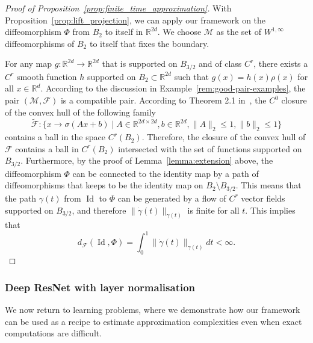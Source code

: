 \documentclass[12pt]{amsart}
\numberwithin{equation}{section}
\theoremstyle{remark}
\begin{document}
\begin{proof}[Proof of Proposition~\ref{prop:finite_time_approximation}]

With Proposition~\ref{prop:lift_projection}, we can apply our framework on the diffeomorphism $\Phi$ from $B_2$ to itself in $\mathbb R^{2d}$. We choose $\mathcal M$ as the set of $W^{1,\infty}$ diffeomorphisms of $B_2$ to itself that fixes the boundary.

For any map $g:\mathbb R^{2d} \to \mathbb R^{2d}$ that is supported on $B_{3/2}$ and of class $C^r$, there exists a $C^r$ smooth function $h$ supported on $B_2\subset \mathbb R^{2d}$ such that $g(x) = h(x)\rho(x)$ for all $x\in \mathbb{R}^d$. 
According to the discussion in Example~\ref{rem:good-pair-examples}, the pair $(\mathcal M, \mathcal F)$ is a compatible pair. According to Theorem 2.1 in~\cite{yang2025optimal}, the $C^0$ closure of the convex hull of the following family
\begin{equation}
\tilde{\mathcal F}:  \{x\to \sigma(A x+b) \mid A\in \mathbb R^{2d\times 2d}, b\in \mathbb R^{2d}, \|A\|_2 \le 1, \|b\|_2 \le 1 \}
\end{equation}
contains a ball in the space $C^r(B_2)$. Therefore, the closure of the convex hull of $\mathcal F$ contains a ball in $C^r(B_2)$ intersected with the set of functions supported on $B_{3/2}$. 
Furthermore, by the proof of Lemma~\ref{lemma:extension} above, the diffeomorphism $\Phi$ can be connected to the identity map by a path of diffeomorphisms that keeps to be the identity map on $B_2\setminus B_{3/2}$.
This means that the path $\gamma(t)$ from $\operatorname{Id}$ to $\Phi$ can be generated by a flow of $C^r$ vector fields supported on $B_{3/2}$, and therefore $\|\dot\gamma(t)\|_{\gamma(t)}$ is finite for all $t$. This implies that
\begin{equation}
    d_{\mathcal F}(\operatorname{Id}, \Phi) = \int_0^1 \|\dot\gamma(t)\|_{\gamma(t)} dt < \infty.
\end{equation}

\end{proof}

















\subsubsection{Deep ResNet with layer normalisation}
We now return to learning problems, where we demonstrate how our framework
can be used as a recipe to estimate approximation complexities even when exact computations are difficult.
\end{document}
